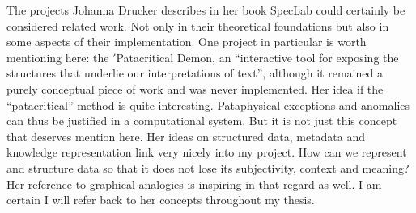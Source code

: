 The projects Johanna Drucker describes in her book SpecLab \autocite{Drucker2009}  could certainly be considered related work. Not only in their theoretical foundations but also in some aspects of their implementation. One project in particular is worth mentioning here: the $'$Patacritical Demon, an ``interactive tool for exposing the structures that underlie our interpretations of text'', although it remained a purely conceptual piece of work and was never implemented. Her idea if the ``patacritical'' method is quite interesting. Pataphysical exceptions and anomalies can thus be justified in a computational system. But it is not just this concept that deserves mention here.
Her ideas on structured data, metadata and knowledge representation link very nicely into my project. How can we represent and structure data so that it does not lose its subjectivity, context and meaning? Her reference to graphical analogies is inspiring in that regard as well. I am certain I will refer back to her concepts throughout my thesis.


